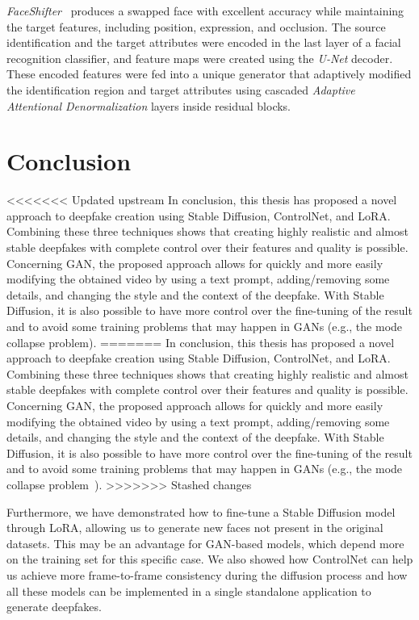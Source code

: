 \documentclass[preprint]{elsarticle}
\begin{document}
\emph{FaceShifter}~\cite{faceshifter} produces a swapped face with excellent accuracy while maintaining the target features, including position, expression, and occlusion. The source identification and the target attributes were encoded in the last layer of a facial recognition classifier, and feature maps were created using the \emph{U-Net} decoder. These encoded features were fed into a unique generator that adaptively modified the identification region and target attributes using cascaded \emph{Adaptive Attentional Denormalization} layers inside residual blocks.



\section{Conclusion}\label{sect:conclusion}
<<<<<<< Updated upstream
In conclusion, this thesis has proposed a novel approach to deepfake creation using Stable Diffusion, ControlNet, and LoRA. Combining these three techniques shows that creating highly realistic and almost stable deepfakes with complete control over their features and quality is possible. Concerning GAN, the proposed approach allows for quickly and more easily modifying the obtained video by  using a text prompt, adding/removing some details, and changing the style  and the context of the deepfake. With Stable Diffusion, it is also possible to have more control over the fine-tuning of the result and to avoid some training problems that may happen in GANs (e.g., the mode collapse problem).
=======
In conclusion, this thesis has proposed a novel approach to deepfake creation using Stable Diffusion, ControlNet, and LoRA. Combining these three techniques shows that creating highly realistic and almost stable deepfakes with complete control over their features and quality is possible. Concerning GAN, the proposed approach allows for quickly and more easily modifying the obtained video by  using a text prompt, adding/removing some details, and changing the style  and the context of the deepfake. With Stable Diffusion, it is also possible to have more control over the fine-tuning of the result and to avoid some training problems that may happen in GANs (e.g., the mode collapse problem~\cite{collapse}).
>>>>>>> Stashed changes

Furthermore, we have demonstrated how to fine-tune a Stable Diffusion model through LoRA,  allowing us to generate new faces not present in the original datasets. This may be an advantage for GAN-based models, which depend more on the training set for this specific case. We also showed how ControlNet can help us achieve more frame-to-frame consistency during the diffusion process and how all these models can be implemented in a single standalone application to generate deepfakes. 
\end{document}
